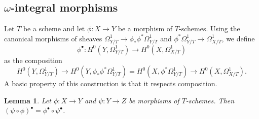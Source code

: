 \documentclass[11pt]{amsart}
\newtheorem{lemma}[theorem]{Lemma}
\theoremstyle{remark}
\numberwithin{equation}{section}
\begin{document}
\subsection{$\omega$-integral morphisms} Let $T$ be a scheme and let $\phi:X\to Y$ be a morphism of $T$-schemes. Using the canonical morphisms of sheaves $\Omega^1_{Y/T}\to \phi_*\phi^*\Omega^1_{Y/T}$ and $\phi^*\Omega^1_{Y/T}\to \Omega^1_{X/T}$, we define 
$$
\phi^\bullet : H^0(Y,\Omega^1_{Y/T})\to H^0(X,\Omega^1_{X/T})
$$ 
as the composition
$$
H^0(Y,\Omega^1_{Y/T})\to H^0(Y,\phi_*\phi^*\Omega^1_{Y/T})=H^0(X,\phi^*\Omega^1_{Y/T})\to H^0(X,\Omega^1_{X/T}).
$$
A basic property of this construction is that it respects composition. 
\begin{lemma}\label{LemmaCompositionInt} Let $\phi: X\to Y$ and $\psi: Y \to Z$ be morphisms of $T$-schemes. Then $(\psi\circ \phi)^\bullet = \phi^\bullet \circ \psi^\bullet$.
\end{lemma}
\end{document}
